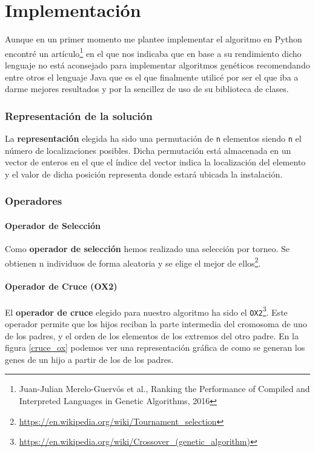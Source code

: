 \chapter{Implementación}

Aunque en un primer momento me plantee implementar el algoritmo en Python encontré un  artículo\footnote{Juan-Julian Merelo-Guervós et al., Ranking the Performance of Compiled and Interpreted Languages in Genetic Algorithms, 2016} en el que nos indicaba que en base a su rendimiento dicho lenguaje no está aconsejado para implementar algoritmos genéticos recomendando entre otros el lenguaje Java que es el que finalmente utilicé por ser el que iba a darme mejores resultados y por la sencillez de uso de su biblioteca de clases.

\subsection{Representación de la solución}

La \textbf{representación} elegida ha sido una permutación de \texttt{n} elementos siendo \texttt{n} el número de localizaciones posibles. Dicha permutación está almacenada en un vector de enteros en el que el índice del vector indica la localización del elemento y el valor de dicha posición representa donde estará ubicada la instalación.

\subsection{Operadores}

\subsubsection{Operador de Selección}

Como \textbf{operador de selección} hemos realizado una selección por torneo. Se obtienen n individuos de forma aleatoria y se elige el mejor de ellos\footnote{\url{https://en.wikipedia.org/wiki/Tournament_selection}}.

\subsubsection{Operador de Cruce (OX2)}
El \textbf{operador de cruce} elegido para nuestro algoritmo ha sido el \texttt{OX2}\footnote{\url{https://en.wikipedia.org/wiki/Crossover_(genetic_algorithm)}}. Este operador permite que los hijos reciban la parte intermedia del cromosoma de uno de los padres, y el orden de los elementos de los extremos del otro padre. En la figura \ref{cruce_ox} podemos ver una representación gráfica de como se generan los genes de un hijo a partir de los de los padres.

